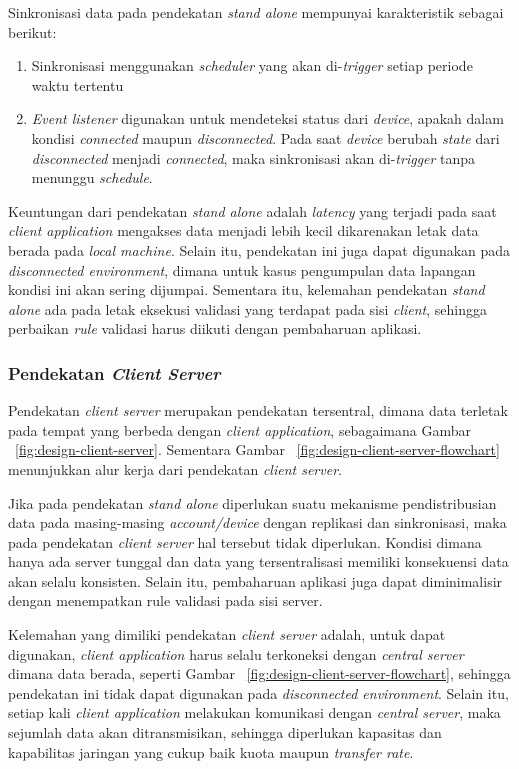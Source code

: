Sinkronisasi data pada pendekatan \textit{stand alone} mempunyai karakteristik sebagai berikut:
\begin{enumerate}
\item Sinkronisasi menggunakan \textit{scheduler} yang akan di-\textit{trigger} setiap periode waktu tertentu
\item \textit{Event listener} digunakan untuk mendeteksi status dari \textit{device}, apakah dalam kondisi \textit{connected} maupun \textit{disconnected}. Pada saat \textit{device} berubah \textit{state} dari \textit{disconnected} menjadi \textit{connected}, maka sinkronisasi akan di-\textit{trigger} tanpa menunggu \textit{schedule}.
\end{enumerate}

Keuntungan dari pendekatan \textit{stand alone} adalah \textit{latency} yang terjadi pada saat \textit{client application} mengakses data menjadi lebih kecil dikarenakan letak data berada pada \textit{local machine}. Selain itu, pendekatan ini juga dapat digunakan pada \textit{disconnected environment}, dimana untuk kasus pengumpulan data lapangan kondisi ini akan sering dijumpai. Sementara itu, kelemahan pendekatan \textit{stand alone} ada pada letak eksekusi validasi yang terdapat pada sisi \textit{client}, sehingga perbaikan \textit{rule} validasi harus diikuti dengan pembaharuan aplikasi.


\subsubsection{Pendekatan \textit{Client Server}} \label{sssec:client-server}

Pendekatan \textit{client server} merupakan pendekatan tersentral, dimana data terletak pada tempat yang berbeda dengan \textit{client application}, sebagaimana Gambar ~\ref{fig:design-client-server}. Sementara Gambar ~\ref{fig:design-client-server-flowchart} menunjukkan alur kerja dari pendekatan \textit{client server}.


Jika pada pendekatan \textit{stand alone} diperlukan suatu mekanisme pendistribusian data pada masing-masing \textit{account/device} dengan replikasi dan sinkronisasi, maka pada pendekatan \textit{client server} hal tersebut tidak diperlukan. Kondisi dimana hanya ada server tunggal dan data yang tersentralisasi memiliki konsekuensi data akan selalu konsisten. Selain itu, pembaharuan aplikasi juga dapat diminimalisir dengan menempatkan rule validasi pada sisi server.


Kelemahan yang dimiliki pendekatan \textit{client server} adalah, untuk dapat digunakan, \textit{client application} harus selalu terkoneksi dengan \textit{central server} dimana data berada, seperti Gambar ~\ref{fig:design-client-server-flowchart}, sehingga pendekatan ini tidak dapat digunakan pada \textit{disconnected environment}. Selain itu, setiap kali \textit{client application} melakukan komunikasi dengan \textit{central server}, maka sejumlah data akan ditransmisikan, sehingga diperlukan kapasitas dan kapabilitas jaringan yang cukup baik kuota maupun \textit{transfer rate}. 

